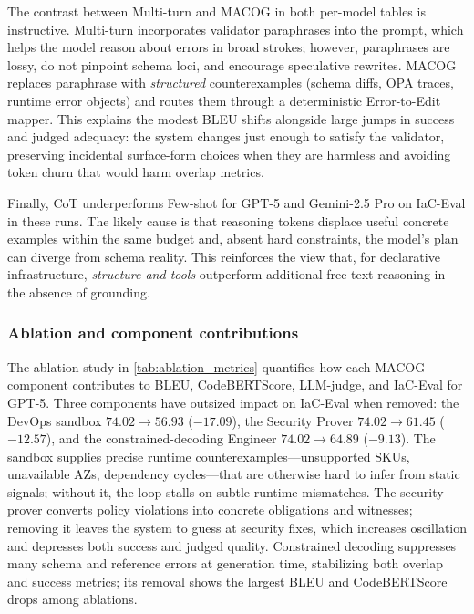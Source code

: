 \documentclass[acmsmall,screen,review,anonymous]{acmart}
\begin{document}
The contrast between Multi-turn and MACOG in both per-model tables is instructive. Multi-turn incorporates validator paraphrases into the prompt, which helps the model reason about errors in broad strokes; however, paraphrases are lossy, do not pinpoint schema loci, and encourage speculative rewrites. MACOG replaces paraphrase with \emph{structured} counterexamples (schema diffs, OPA traces, runtime error objects) and routes them through a deterministic Error-to-Edit mapper. This explains the modest BLEU shifts alongside large jumps in success and judged adequacy: the system changes just enough to satisfy the validator, preserving incidental surface-form choices when they are harmless and avoiding token churn that would harm overlap metrics.

Finally, CoT underperforms Few-shot for GPT-5 and Gemini-2.5 Pro on IaC-Eval in these runs. The likely cause is that reasoning tokens displace useful concrete examples within the same budget and, absent hard constraints, the model’s plan can diverge from schema reality. This reinforces the view that, for declarative infrastructure, \emph{structure and tools} outperform additional free-text reasoning in the absence of grounding.

\subsubsection{Ablation and component contributions}

The ablation study in \autoref{tab:ablation_metrics} quantifies how each MACOG component contributes to BLEU, CodeBERTScore, LLM-judge, and IaC-Eval for GPT-5. Three components have outsized impact on IaC-Eval when removed: the DevOps sandbox \(74.02 \rightarrow 56.93\) (\(-17.09\)), the Security Prover \(74.02 \rightarrow 61.45\) (\(-12.57\)), and the constrained-decoding Engineer \(74.02 \rightarrow 64.89\) (\(-9.13\)). The sandbox supplies precise runtime counterexamples—unsupported SKUs, unavailable AZs, dependency cycles—that are otherwise hard to infer from static signals; without it, the loop stalls on subtle runtime mismatches. The security prover converts policy violations into concrete obligations and witnesses; removing it leaves the system to guess at security fixes, which increases oscillation and depresses both success and judged quality. Constrained decoding suppresses many schema and reference errors at generation time, stabilizing both overlap and success metrics; its removal shows the largest BLEU and CodeBERTScore drops among ablations.
\end{document}
